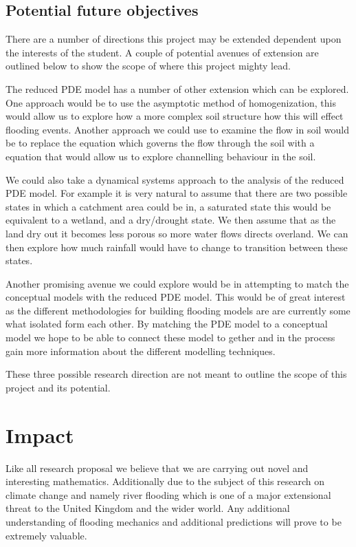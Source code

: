 \documentclass[11pt]{article}
\begin{document}
\subsection{Potential future objectives}

There are a number of directions this project may be extended dependent upon the interests of the student. A couple of potential avenues of extension are outlined below to show the scope of where this project mighty lead.

 The reduced PDE model has a number of other extension which can be explored. One approach would be to use the asymptotic method of homogenization, this would allow us to explore how a more complex soil structure how this will effect flooding events. Another approach we could use to examine the flow in soil would be to replace the equation which governs the flow through the soil with a equation that would allow us to explore channelling behaviour in the soil.

We could also take a dynamical systems approach to the analysis of the reduced PDE model. For example it is very natural to assume that there are two possible states in which a catchment area could be in, a saturated state this would be equivalent to a wetland, and a dry/drought state. We then assume that as the land dry out it becomes less porous so more water flows directs overland. We can then explore how much rainfall would have to change to transition between these states.

Another promising avenue we could explore would be in attempting to match the conceptual models with the reduced PDE model. This would be of great interest as the different methodologies for building flooding models are are currently some what isolated form each other. By matching the PDE model to a conceptual model we hope to be able to connect these model to gether and in the process gain more information about the different modelling techniques.

These three possible research direction are not meant to outline the scope of this project and its potential.



\section{Impact}
Like all research proposal we believe that we are carrying out novel and interesting mathematics. Additionally due to the subject of this research on climate change and namely river flooding which is one of a major extensional threat to the United Kingdom and the wider world. Any additional understanding of flooding mechanics and additional predictions will prove to be extremely valuable.
\end{document}
